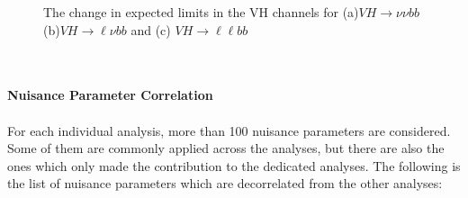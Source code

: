 \begin{figure}[ht]
	\centering
		
	\caption{The change in expected limits in the VH channels for (a)$VH\to\nu\nu bb$ (b)$VH\to\ell\nu bb$ and (c) $VH\to\ell\ell bb$ }
	\label{Fig:limits_Hbb}
\end{figure}
\noindent
\\
\\{\bf Nuisance Parameter Correlation}
\\
\\For each individual analysis, more than 100 nuisance parameters are considered. Some of them are commonly applied across the analyses, but there are also the ones which only made the contribution to the dedicated analyses. The following is the list of nuisance parameters which are decorrelated from the other analyses:
